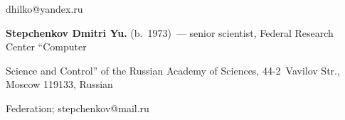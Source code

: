 \mbox{dhilko@yandex.ru}



\vspace*{3pt}



\noindent

\textbf{Stepchenkov Dmitri Yu.} (b.\ 1973)~--- senior scientist, Federal Research Center ``Computer 

Science and Control'' of the Russian Academy of Sciences, 44-2~Vavilov Str., Moscow 119133, Russian 

Federation; \mbox{stepchenkov@mail.ru}

\label{end\stat}



\renewcommand{\bibname}{\protect\rm Литература} 

